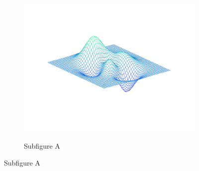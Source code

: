 \documentclass[a4paper,12pt]{article}
\begin{document}
	\newcommand{\Title}{Title of Figure}
		\begin{figure}[tbph]
			\iftoggle{longnotes}{ \caption{\Title} }{ \caption*{\Title} } \label{fig:exsubfigpdf}
			\begin{center}							%
				\begin{minipage}{0.9\linewidth}
						\begin{subfigure}[t]{\linewidth}
							\begin{center}			%
								\includegraphics[trim={0cm 0cm 0cm 0cm},clip,height=0.2\textheight,width=1\linewidth,keepaspectratio]{../Figures/Plain/exfigure1} \\
							\end{center}
							\vspace{-0.5cm}
							\caption{Subfigure A} \label{subfig:exsubfigureA}
							\vspace{0.5cm}
						\end{subfigure}
						

\end{minipage}
\end{center}
\end{figure}
\end{document}
